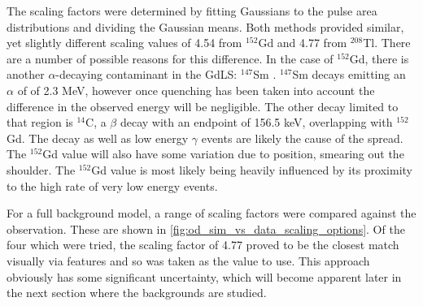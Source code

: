 \par
The scaling factors were determined by fitting Gaussians to the pulse area distributions and dividing the Gaussian means.
Both methods provided similar, yet slightly different scaling values of 4.54 from ${}^{152}$Gd and 4.77 from ${}^{208}$Tl.
There are a number of possible reasons for this difference.
In the case of ${}^{152}$Gd, there is another $\alpha$-decaying contaminant in the GdLS: ${}^{147}$Sm \cite{scotthaselschwardt_thesis_ref}.
${}^{147}$Sm decays emitting an $\alpha$ of of 2.3 MeV, however once quenching has been taken into account the difference in the observed energy will be negligible.
The other decay limited to that region is ${}^{14}$C, a $\beta$ decay with an endpoint of 156.5 keV, overlapping with ${}^{152}$Gd.
The decay as well as low energy $\gamma$ events are likely the cause of the spread.
The ${}^{152}$Gd value will also have some variation due to position, smearing out the shoulder.
The ${}^{152}$Gd value is most likely being heavily influenced by its proximity to the high rate of very low energy events.

\par
For a full background model, a range of scaling factors were compared against the observation.
These are shown in \autoref{fig:od_sim_vs_data_scaling_options}.
Of the four which were tried, the scaling factor of 4.77 proved to be the closest match visually via features and so was taken as the value to use.
This approach obviously has some significant uncertainty, which will become apparent later in the next section where the backgrounds are studied.






